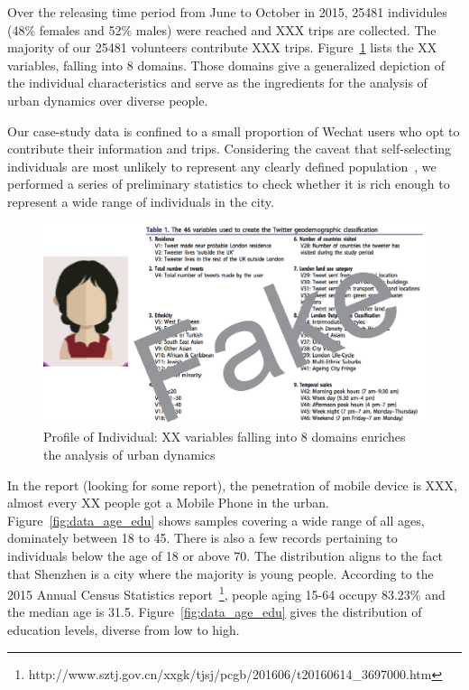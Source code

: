 Over the releasing time period from June to October in 2015, 25481 individules (48\% females and 52\% males) were reached and XXX trips are collected. The majority of our 25481 volunteers contribute XXX trips. Figure~\ref{fig:data_over} lists the XX variables, falling into 8 domains. Those domains give a generalized depiction of the individual characteristics and serve as the ingredients for the analysis of urban dynamics over diverse people. 

Our case-study data is confined to a small proportion of Wechat users who opt to contribute their information and trips.
Considering the caveat that self-selecting individuals are most unlikely to represent any clearly defined population~\cite{Longley2015}, we performed a series of preliminary statistics to check whether it is rich enough to represent a wide range of individuals in the city. 


\begin{figure}[htb!]
 \centering %
 \includegraphics[width=\columnwidth]{pictures/data_over}
 \caption{Profile of Individual: XX variables falling into 8 domains enriches the analysis of urban dynamics}
 \label{fig:data_over}
\end{figure}

In the report (looking for some report), the penetration of mobile device is XXX, almost every XX people got a Mobile Phone in the urban. Figure~\ref{fig:data_age_edu} shows samples covering a wide range of all ages, dominately between 18 to 45. There is also a few records pertaining to individuals below the age of 18 or above 70. The distribution aligns to the fact that Shenzhen is a city where the majority is young people. According to the 2015 Annual Census Statistics report~\footnote{http://www.sztj.gov.cn/xxgk/tjsj/pcgb/201606/t20160614\_3697000.htm}, people aging 15-64 occupy 83.23\% and the median age is 31.5. Figure~\ref{fig:data_age_edu} gives the distribution of education levels, diverse from low to high. 

